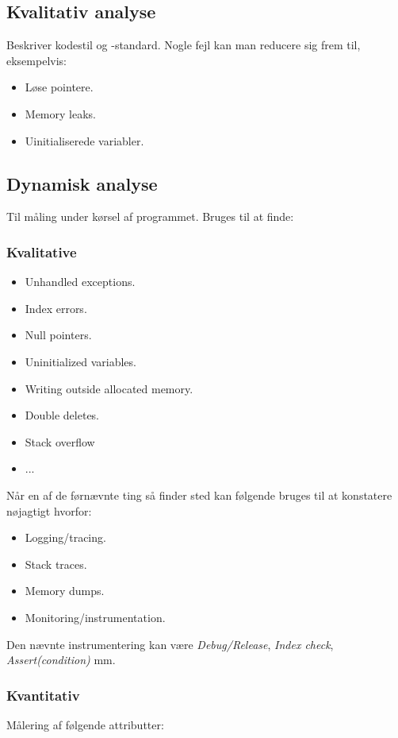 \subsection{Kvalitativ analyse}
Beskriver kodestil og -standard. Nogle fejl kan man reducere sig frem til, eksempelvis: 

\begin{itemize}
	\item Løse pointere.
	\item Memory leaks.
	\item Uinitialiserede variabler.
\end{itemize}

\subsection{Dynamisk analyse}
Til måling under kørsel af programmet. Bruges til at finde: 

\subsubsection{Kvalitative}

\begin{itemize}
	\item Unhandled exceptions.
	\item Index errors.
	\item Null pointers.
	\item Uninitialized variables.
	\item Writing outside allocated memory.
	\item Double deletes.
	\item Stack overflow
	\item ...
\end{itemize}

Når en af de førnævnte ting så finder sted kan følgende bruges til at konstatere nøjagtigt hvorfor:

\begin{itemize}
	\item Logging/tracing.
	\item Stack traces.
	\item Memory dumps.
	\item Monitoring/instrumentation.
\end{itemize}

Den nævnte instrumentering kan være \textit{Debug/Release}, \textit{Index check}, \textit{Assert(condition)} mm.

\subsubsection{Kvantitativ}
Målering af følgende attributter:

